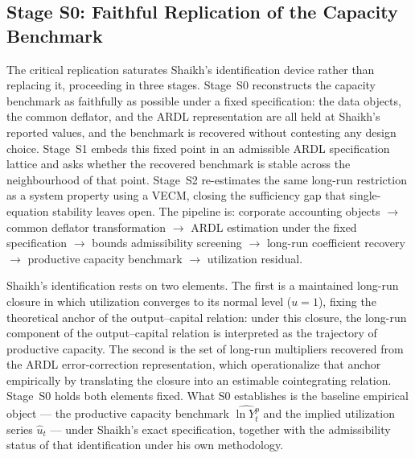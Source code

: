 \documentclass[11pt,a4paper]{article}
\begin{document}
\subsection{Stage S0: Faithful Replication of the Capacity Benchmark}
\label{subsec:S0_shaikh_replication}


The critical replication saturates Shaikh's identification device rather
than replacing it, proceeding in three stages. Stage~S0 reconstructs the
capacity benchmark as faithfully as possible under a fixed specification:
the data objects, the common deflator, and the ARDL representation are all
held at Shaikh's reported values, and the benchmark is recovered without
contesting any design choice. Stage~S1 embeds this fixed point in an
admissible ARDL specification lattice and asks whether the recovered
benchmark is stable across the neighbourhood of that point. Stage~S2
re-estimates the same long-run restriction as a system property using a
VECM, closing the sufficiency gap that single-equation stability leaves
open. The pipeline is: corporate accounting objects $\to$ common deflator
transformation $\to$ ARDL estimation under the fixed specification $\to$
bounds admissibility screening $\to$ long-run coefficient recovery $\to$
productive capacity benchmark $\to$ utilization residual.


Shaikh's identification rests on two elements. The first is a maintained
long-run closure in which utilization converges to its normal level
($u = 1$), fixing the theoretical anchor of the output--capital relation:
under this closure, the long-run component of the output--capital relation
is interpreted as the trajectory of productive capacity. The second is the
set of long-run multipliers recovered from the ARDL error-correction
representation, which operationalize that anchor empirically by translating
the closure into an estimable cointegrating relation. Stage~S0 holds
both elements fixed. What S0 establishes is the baseline empirical
object --- the productive capacity benchmark $\widehat{\ln Y_t^p}$ and the
implied utilization series $\widehat{u}_t$ --- under Shaikh's exact
specification, together with the admissibility status of that
identification under his own methodology.
\end{document}
